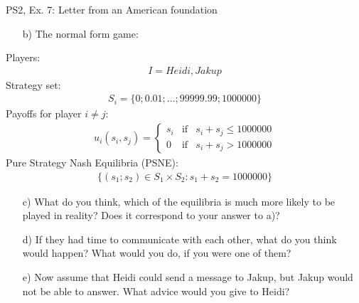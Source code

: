 \begin{frame}{PS2, Ex. 7: Letter from an American foundation}
  \begin{multicols}{2}
    \begin{itemize}
      \item[b)] The normal form game:
    \end{itemize}
    Players: \begin{align*}I={Heidi,Jakup}\end{align*}
    Strategy set: \begin{align*}
      S_i = \{0; 0.01; ... ; 99999.99; 1000000\}\end{align*}
    Payoffs for player $i\neq j$: \begin{align*}
      u_i(s_i,s_j)=
      \left\{ \begin{array}{ccl}
      s_i & \mbox{if} & s_i+s_j \leq 1000000 \\
      0   & \mbox{if} & s_i+s_j > 1000000
      \end{array}\right. \end{align*}
    Pure Strategy Nash Equilibria (PSNE): \begin{align*} \{(s_1; s_2)\in S_1\times S_2 : s_1 + s_2 = 1000000\} \end{align*}
  \vfill\null \columnbreak
    \begin{itemize}
      \item[c)] What do you think, which of the equilibria is much more likely to be played in reality? Does it correspond to your answer to a)?
      \item[d)] If they had time to communicate with each other, what do you think would happen? What would you do, if you were one of them?
      \item[e)] Now assume that Heidi could send a message to Jakup, but Jakup would not be able to answer. What advice would you give to Heidi?
    \end{itemize}
  \vfill\null
  \end{multicols}
\end{frame}
